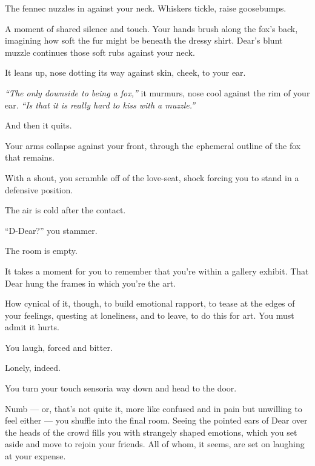 The fennec nuzzles in against your neck. Whiskers tickle, raise goosebumps.

A moment of shared silence and touch. Your hands brush along the fox's back, imagining how soft the fur might be beneath the dressy shirt. Dear's blunt muzzle continues those soft rubs against your neck.

It leans up, nose dotting its way against skin, cheek, to your ear.

\emph{``The only downside to being a fox,''} it murmurs, nose cool against the rim of your ear. \emph{``Is that it is really hard to kiss with a muzzle.''}

\vfill

\begin{flushright}
\footnotesize
And then it quits.\hspace{2cm}\null
\end{flushright}
\vspace{1cm}

\newpage

\null
\vfill

Your arms collapse against your front, through the ephemeral outline of the fox that remains.

With a shout, you scramble off of the love-seat, shock forcing you to stand in a defensive position.

The air is cold after the contact.

``D-Dear?'' you stammer.

The room is empty.
\vfill
\newpage
\null
\vfill

It takes a moment for you to remember that you're within a gallery exhibit. That Dear hung the frames in which you're the art.

How cynical of it, though, to build emotional rapport, to tease at the edges of your feelings, questing at loneliness, and to leave, to do this for art. You must admit it hurts.

You laugh, forced and bitter.

Lonely, indeed.

You turn your touch sensoria way down and head to the door.

\vfill

\newpage
\null
\newpage

Numb --- or, that's not quite it, more like confused and in pain but unwilling to feel either --- you shuffle into the final room. Seeing the pointed ears of Dear over the heads of the crowd fills you with strangely shaped emotions, which you set aside and move to rejoin your friends. All of whom, it seems, are set on laughing at your expense.

